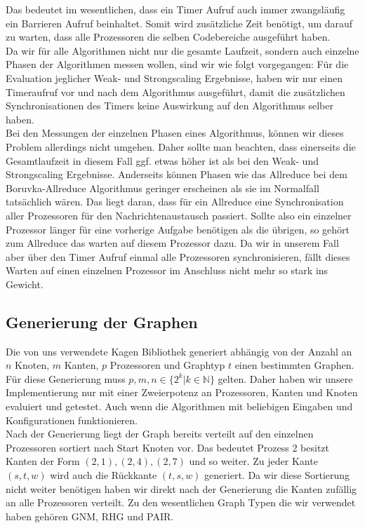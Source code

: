 Das bedeutet im wesentlichen, dass ein Timer Aufruf auch immer zwangsläufig ein Barrieren Aufruf beinhaltet. Somit wird zusätzliche Zeit benötigt, um darauf zu warten, dass alle Prozessoren die selben Codebereiche ausgeführt haben. \\
Da wir für alle Algorithmen nicht nur die gesamte Laufzeit, sondern auch einzelne Phasen der Algorithmen messen wollen, sind wir wie folgt vorgegangen: Für die Evaluation jeglicher Weak- und Strongscaling Ergebnisse, haben wir nur einen Timeraufruf vor und nach dem Algorithmus ausgeführt, damit die zusätzlichen Synchronisationen des Timers keine Auswirkung auf den Algorithmus selber haben.\\
Bei den Messungen der einzelnen Phasen eines Algorithmus, können wir dieses Problem allerdings nicht umgehen. Daher sollte man beachten, dass einerseits die Gesamtlaufzeit in diesem Fall ggf. etwas höher ist als bei den Weak- und Strongscaling Ergebnisse. Anderseits können Phasen wie das Allreduce bei dem Boruvka-Allreduce Algorithmus geringer erscheinen als sie im Normalfall tatsächlich wären. Das liegt daran, dass für ein Allreduce eine Synchronisation aller Prozessoren für den Nachrichtenaustausch passiert. Sollte also ein einzelner Prozessor länger für eine vorherige Aufgabe benötigen als die übrigen, so gehört zum Allreduce das warten auf diesem Prozessor dazu. Da wir in unserem Fall aber über den Timer Aufruf einmal alle Prozessoren synchronisieren, fällt dieses Warten auf einen einzelnen Prozessor im Anschluss nicht mehr so stark ins Gewicht.


\subsection{Generierung der Graphen}
Die von uns verwendete Kagen Bibliothek generiert abhängig von der Anzahl an $n$ Knoten, $m$ Kanten, $p$ Prozessoren und Graphtyp $t$ einen bestimmten Graphen. Für diese Generierung muss $p,m,n \in \{2^k | k \in \mathbb{N}\}$ gelten. Daher haben wir unsere Implementierung nur mit einer Zweierpotenz an Prozessoren, Kanten und Knoten evaluiert und getestet. Auch wenn die Algorithmen mit beliebigen Eingaben und Konfigurationen funktionieren. \\
Nach der Generierung liegt der Graph bereits verteilt auf den einzelnen Prozessoren sortiert nach Start Knoten vor. Das bedeutet Prozess 2 besitzt Kanten der Form $(2,1), (2,4), (2,7)$ und so weiter. Zu jeder Kante $(s,t,w)$ wird auch die Rückkante $(t,s,w)$ generiert. Da wir diese Sortierung nicht weiter benötigen haben wir direkt nach der Generierung die Kanten zufällig an alle Prozessoren verteilt. Zu den wesentlichen Graph Typen die wir verwendet haben gehören GNM, RHG und PAIR. 

